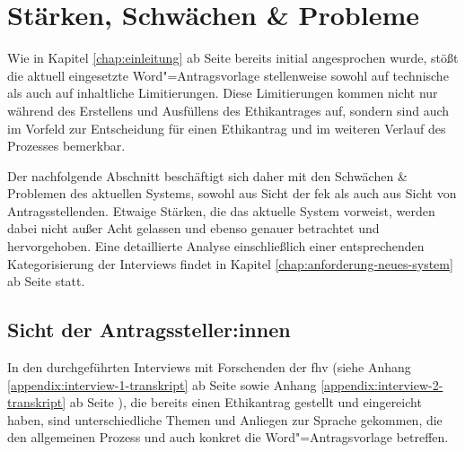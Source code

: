 \documentclass[a4paper,12pt,twoside]{scrreprt}
\begin{document}
\section{Stärken, Schwächen \& Probleme}
\label{sec:stärken-schwächen-probleme}

Wie in Kapitel \ref{chap:einleitung} ab Seite \pageref{chap:einleitung} bereits initial angesprochen wurde, stößt die aktuell eingesetzte Word"=Antragsvorlage stellenweise sowohl auf technische als auch auf inhaltliche Limitierungen. Diese Limitierungen kommen nicht nur während des Erstellens und Ausfüllens des Ethikantrages auf, sondern sind auch im Vorfeld zur Entscheidung für einen Ethikantrag und im weiteren Verlauf des Prozesses bemerkbar.

Der nachfolgende Abschnitt beschäftigt sich daher mit den Schwächen \& Problemen des aktuellen Systems, sowohl aus Sicht der \ac{fek} als auch aus Sicht von Antragsstellenden. Etwaige Stärken, die das aktuelle System vorweist, werden dabei nicht außer Acht gelassen und ebenso genauer betrachtet und hervorgehoben. Eine detaillierte Analyse einschließlich einer entsprechenden Kategorisierung der Interviews findet in Kapitel \ref{chap:anforderung-neues-system} ab Seite \pageref{chap:anforderung-neues-system} statt.

\subsection{Sicht der Antragssteller:innen}
\label{sub-sec:probleme-sicht-antragssteller}

In den durchgeführten Interviews mit Forschenden der \ac{fhv} (siehe Anhang \ref{appendix:interview-1-transkript} ab Seite \pageref{appendix:interview-1-transkript} sowie Anhang \ref{appendix:interview-2-transkript} ab Seite \pageref{appendix:interview-2-transkript}), die bereits einen Ethikantrag gestellt und eingereicht haben, sind unterschiedliche Themen und Anliegen zur Sprache gekommen, die den allgemeinen Prozess und auch konkret die Word"=Antragsvorlage betreffen.
\end{document}
